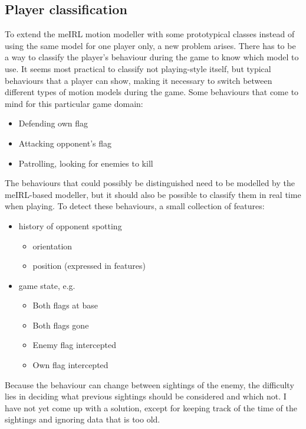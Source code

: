 \documentclass[a4paper, 12pt]{article}
\begin{document}
\subsection{Player classification}
To extend the meIRL motion modeller with some prototypical classes instead of
using the same model for one player only, a new problem arises. There has to be
a way to classify the player's behaviour during the game to know which model to
use. It seems most practical to classify not playing-style itself, but typical
behaviours that a player can show, making it necessary to switch
between different types of motion models during the game.
Some behaviours that come to mind for this particular game domain:
\begin{itemize}
    \item Defending own flag
    \item Attacking opponent's flag
    \item Patrolling, looking for enemies to kill
\end{itemize}
The behaviours that could possibly be distinguished need to be modelled by the
meIRL-based modeller, but it should also be possible to classify them in real time when playing.
To detect these behaviours, a small collection of features:
\begin{itemize}
    \item history of opponent spotting
        \begin{itemize}
            \item orientation
            \item position (expressed in features)
        \end{itemize}
    \item game state, e.g.
        \begin{itemize}
            \item Both flags at base
            \item Both flags gone
            \item Enemy flag intercepted
            \item Own flag intercepted
        \end{itemize}
\end{itemize}

Because the behaviour can change between sightings of the enemy, the difficulty
lies in deciding what previous sightings should be considered and which not. I
have not yet come up with a solution, except for keeping track of the time of
the sightings and ignoring data that is too old.
\end{document}
